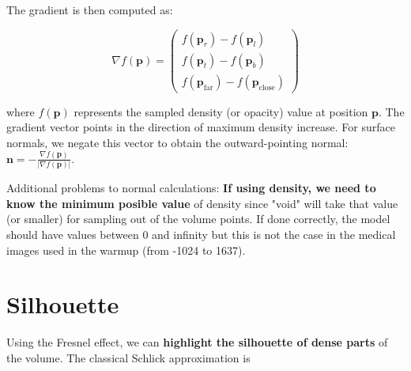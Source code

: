 \documentclass[10pt,a4paper,twoside]{tau-book}
\begin{document}
The gradient is then computed as:

\begin{equation}
    \nabla f(\mathbf{p}) = \begin{pmatrix}
        f(\mathbf{p}_r) - f(\mathbf{p}_l) \\
        f(\mathbf{p}_t) - f(\mathbf{p}_b) \\
        f(\mathbf{p}_{\text{far}}) - f(\mathbf{p}_{\text{close}})
    \end{pmatrix}
\end{equation}

where $f(\mathbf{p})$ represents the sampled density (or opacity) value at position $\mathbf{p}$. The gradient vector points in the direction of maximum density increase. For surface normals, we negate this vector to obtain the outward-pointing normal: $\mathbf{n} = -\frac{\nabla f(\mathbf{p})}{|\nabla f(\mathbf{p})|}$.



Additional problems to normal calculations: \textbf{If using  density, we need to know the minimum posible value} of density since "void" will take that value (or smaller) for sampling out of the volume points. If done correctly, the model should have values between 0 and infinity but this is not the case in the medical images used in the warmup (from -1024 to 1637).



\section{Silhouette}
Using the Fresnel effect, we can \textbf{highlight the silhouette of dense parts} of the volume. The classical Schlick approximation is
\end{document}
